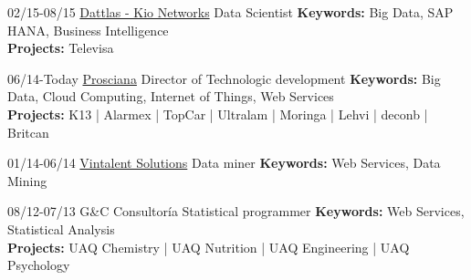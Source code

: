 \documentclass[]{friggeri-cv}
\begin{document}
\begin{entrylist}
\entry
{02/15-08/15}
{\href{http://www.dattlas.com}{Dattlas - Kio Networks}}
{Data Scientist} 
{\textbf{Keywords:} Big Data, SAP HANA, Business Intelligence\\
\textbf{Projects:} Televisa
}

\entry
{06/14-Today}
{\href{http://www.prosciana.com}{Prosciana}}
{Director of Technologic development} 
{\textbf{Keywords:} Big Data, Cloud Computing, Internet of Things, Web Services\\
\textbf{Projects:} K13 | Alarmex | TopCar | Ultralam | Moringa | Lehvi | deconb | Britcan
}

\entry
{01/14-06/14}
{\href{http://www.vintalent.com}{Vintalent Solutions}}
{Data miner}
{\textbf{Keywords:} Web Services, Data Mining}


\entry
{%
08/12-07/13}
{G\&C Consultor\'{i}a}
{Statistical programmer}
{\textbf{Keywords:} Web Services, Statistical Analysis\\
\textbf{Projects:} UAQ Chemistry | UAQ Nutrition | UAQ Engineering | UAQ Psychology 
}



%
\end{entrylist}
\end{document}
